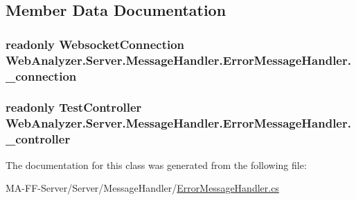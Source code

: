 \subsection{Member Data Documentation}
\hypertarget{class_web_analyzer_1_1_server_1_1_message_handler_1_1_error_message_handler_afcc3d55e1eabc700cafcb9ce2d48106e}{}
\subsubsection[{\+\_\+connection}]{\setlength{\rightskip}{0pt plus 5cm}readonly {\bf Websocket\+Connection} Web\+Analyzer.\+Server.\+Message\+Handler.\+Error\+Message\+Handler.\+\_\+connection\hspace{0.3cm}{\ttfamily [private]}}\label{class_web_analyzer_1_1_server_1_1_message_handler_1_1_error_message_handler_afcc3d55e1eabc700cafcb9ce2d48106e}
\hypertarget{class_web_analyzer_1_1_server_1_1_message_handler_1_1_error_message_handler_acdb5ea45d9c1e9f90af483dd53176fe3}{}
\subsubsection[{\+\_\+controller}]{\setlength{\rightskip}{0pt plus 5cm}readonly {\bf Test\+Controller} Web\+Analyzer.\+Server.\+Message\+Handler.\+Error\+Message\+Handler.\+\_\+controller\hspace{0.3cm}{\ttfamily [private]}}\label{class_web_analyzer_1_1_server_1_1_message_handler_1_1_error_message_handler_acdb5ea45d9c1e9f90af483dd53176fe3}


The documentation for this class was generated from the following file\+:\begin{DoxyCompactItemize}
\item 
M\+A-\/\+F\+F-\/\+Server/\+Server/\+Message\+Handler/\hyperlink{_error_message_handler_8cs}{Error\+Message\+Handler.\+cs}\end{DoxyCompactItemize}
